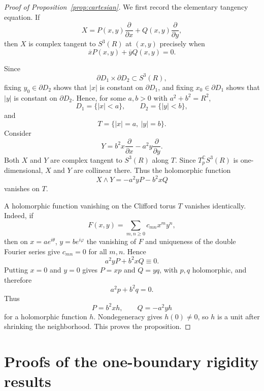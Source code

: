 \documentclass[11pt,reqno]{article}
\theoremstyle{remark}
\newcommand{\C}{\mathbb C}
\newcommand{\pd}{\partial}
\newcommand{\ol}{\overline}
\begin{document}
\begin{proof}[Proof of Proposition~\ref{prop:cartesian}]


We first record the elementary tangency equation. If
\[
 X=P(x,y)\frac{\pd}{\pd x}+Q(x,y)\frac{\pd}{\pd y},
\]
then $X$ is complex tangent to $S^3(R)$ at $(x,y)$ precisely when
\begin{equation}\label{eq:tangency}
 \ol{x}P(x,y)+\ol{y}Q(x,y)=0.
\end{equation}

Since
\[
 \pd D_1\times\pd D_2\subset S^3(R),
\]
fixing $y_0\in\pd D_2$ shows that $|x|$ is constant on $\pd D_1$, and fixing $x_0\in\pd D_1$ shows that $|y|$ is constant on $\pd D_2$. Hence, for some $a,b>0$ with $a^2+b^2=R^2$,
\[
 D_1=\{|x|<a\},\qquad D_2=\{|y|<b\},
\]
and
\[
 T=\{|x|=a,\ |y|=b\}.
\]
Consider
\[
 Y=b^2x\frac{\pd}{\pd x}-a^2y\frac{\pd}{\pd y}.
\]
Both $X$ and $Y$ are complex tangent to $S^3(R)$ along $T$. Since $T_p^{\C}S^3(R)$ is one-dimensional, $X$ and $Y$ are collinear there. Thus the holomorphic function
\[
 X\wedge Y=-a^2yP-b^2xQ
\]
vanishes on $T$.

A holomorphic function vanishing on the Clifford torus $T$ vanishes identically. Indeed, if
\[
 F(x,y)=\sum_{m,n\ge0}c_{mn}x^my^n,
\]
then on $x=ae^{i\theta}$, $y=be^{i\varphi}$ the vanishing of $F$ and uniqueness of the double Fourier series give $c_{mn}=0$ for all $m,n$. Hence
\[
 a^2yP+b^2xQ\equiv0.
\]
Putting $x=0$ and $y=0$ gives $P=xp$ and $Q=yq$, with $p,q$ holomorphic, and therefore
\[
 a^2p+b^2q=0.
\]
Thus
\[
 P=b^2xh,\qquad Q=-a^2yh
\]
for a holomorphic function $h$. Nondegeneracy gives $h(0)\neq0$, so $h$ is a unit after shrinking the neighborhood. This proves the proposition.
\end{proof}

\section{Proofs of the one-boundary rigidity results}
\end{document}
